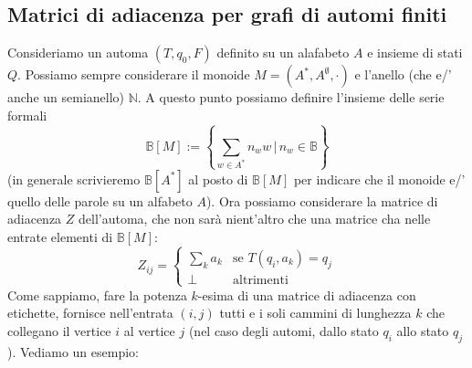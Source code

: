     \subsection{Matrici di adiacenza per grafi di automi finiti}
Consideriamo un automa 
$(T,q_0,F)$ definito su un alafabeto 
$A$ e insieme di stati $Q$.
Possiamo sempre considerare il monoide $M=(A^*,A^\emptyset, \cdot)$ 
e l'anello (che e/' anche un semianello) $\mathbb N$.
A questo punto possiamo definire l'insieme delle serie formali
\[
\mathbb B [M]
:=
\left\{
    \sum_{w \in A^*}n_w w \, | \, n_w \in \mathbb B 
\right\}
\]
(in generale scrivieremo $\mathbb B [A^*]$ al posto di $\mathbb B [M]$
per indicare che il monoide e/' quello delle parole su un alfabeto $A$).
Ora possiamo considerare la matrice di adiacenza $Z$ dell'automa,
che non sarà nient'altro che una matrice cha nelle entrate elementi di 
$\mathbb B[M]$:
\[
Z_{ij}
=
\left\{
\begin{matrix}
    \sum_{k}a_k & \text{se } T(q_i, a_k)=q_j
    \\
    \bot  & \text{altrimenti}
\end{matrix}
\right.
\]
Come sappiamo, 
fare la potenza $k$-esima di una matrice di adiacenza con etichette,
fornisce nell'entrata $(i,j)$
tutti e i soli cammini di lunghezza $k$ che collegano il vertice
$i$ al vertice $j$ 
(nel caso degli automi, dallo stato $q_i$ allo stato $q_j$).
Vediamo un esempio:
